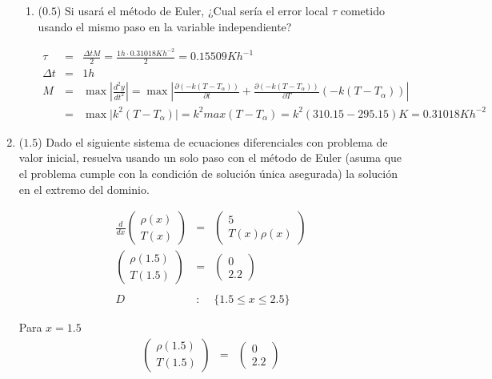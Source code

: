 \documentclass[12pt]{article}
\newcommand{\diffl}[3]{\frac{d^{#3}}{d#2^{#3}}#1}
\begin{document}
\begin{enumerate}[leftmargin=*,widest=9]
\begin{enumerate}[label=\alph*]
    \item (\(0.5\)) Si usará el método de Euler, ¿Cual sería el error local \(\tau\) cometido usando el mismo paso en la variable independiente?

   \begin{eqnarray*}
   \tau &=& \frac{\Delta tM}{2} = \frac{1h\cdot 0.31018Kh^{-2}}{2} = 0.15509Kh^{-1} \\ \Delta t &=& 1h \\ M &=& \max \left\vert \frac{d^2 y}{dt^2}\right\vert = \max \left\vert \frac{\partial (-k(T-T_{\alpha}))}{\partial t} +\frac{\partial (-k(T-T_{\alpha}))}{\partial T} (-k(T-T_{\alpha}))\right\vert \\  &=& \max \vert  k^2 (T -T_{\alpha} )\vert = k^2 max (T -T_{\alpha}) = k^2 (310.15-295.15)K = 0.31018Kh^{-2}
   \end{eqnarray*}


    \end{enumerate}


    \item (\(1.5\)) Dado el siguiente sistema de ecuaciones diferenciales con problema de valor inicial, resuelva usando un solo paso con el método de Euler (asuma que el problema cumple con la condición de solución única asegurada) la solución en el extremo del dominio.

    \begin{eqnarray*}
    \diffl{
		\begin{pmatrix}
			\rho(x) \\ T(x)
		\end{pmatrix}
    }{x}{} &=& \begin{pmatrix}
    5 \\ T(x)\rho(x)
    \end{pmatrix} \\
    \begin{pmatrix}
    \rho(1.5) \\ T(1.5)
    \end{pmatrix} &=& \begin{pmatrix}
    0 \\ 2.2
    \end{pmatrix} \\
    \\
    D &:& \lbrace 1.5 \leq x \leq 2.5 \rbrace
    \end{eqnarray*}


    Para $x= 1.5$
    \begin{eqnarray*}
    	\begin{pmatrix}
			\rho(1.5) \\ T(1.5)
		\end{pmatrix}
     &=& \begin{pmatrix}
    0 \\ 2.2
    \end{pmatrix} \\
    \end{eqnarray*}


\end{enumerate}
\end{document}
